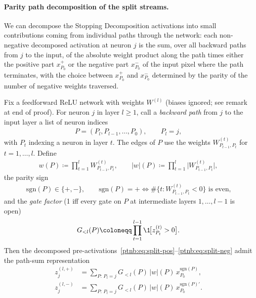 \paragraph{Parity path decomposition of the split streams.}\label{ptnb:app:parity-path}
We can decompose the Stopping Decomposition activations into small contributions coming from
individual paths through the network: each non-negative decomposed activation at neuron $j$ is the
sum, over all backward paths from $j$ to the input, of the absolute weight product along the path
times either the positive part $x_{P_0}^+$ or the negative part $x_{P_0}^-$ of the input pixel
where the path terminates, with the choice between $x_{P_0}^+$ and $x_{P_0}^-$ determined by the
parity of the number of negative weights traversed.

\begin{lemmaenv}\label{ptnb:lem:parity-path}
Fix a feedforward ReLU network with weights $W^{(l)}$ (biases ignored; see remark at end of proof).
For neuron $j$ in layer $l \ge 1$, call a \emph{backward path} from $j$ to the input layer a list
of neuron indices
\begin{align}
    P = (P_l, P_{l-1}, \dots, P_0), \qquad P_l = j,
\end{align}
with $P_t$ indexing a neuron in layer $t$. The edges of $P$ use the weights $W^{(t)}_{P_{t-1},
    P_t}$ for $t = 1, \dots, l$. Define
\begin{align}
    w(P) \coloneqq \prod_{t=1}^{l} W^{(t)}_{P_{t-1}, P_t},
    \qquad
    |w|(P) \coloneqq \prod_{t=1}^{l} \bigl| W^{(t)}_{P_{t-1}, P_t} \bigr|,
\end{align}
the parity sign
\begin{align}
    \mathrm{sgn}(P) \in \{+,-\},
    \qquad
    \mathrm{sgn}(P) = + \iff \#\bigl\{t : W^{(t)}_{P_{t-1}, P_t} < 0\bigr\} \text{ is even,}
\end{align}
and the \emph{gate factor} (1 iff every gate on $P$ at intermediate layers $1,\dots,l-1$ is open)
\begin{align}
    G_{<l}(P) \coloneqq \prod_{t=1}^{l-1} \1\!\bigl[z_{P_t}^{(t)} > 0\bigr].
\end{align}
Then the decomposed pre-activations~\eqref{ptnb:eq:split-pos}--\eqref{ptnb:eq:split-neg} admit the path-sum
representation
\begin{align}
    z_j^{(l,+)} &= \sum_{P:\, P_l = j} G_{<l}(P)\, |w|(P)\, x_{P_0}^{\mathrm{sgn}(P)},
    \label{ptnb:eq:parity-plus}\\
    z_j^{(l,-)} &= \sum_{P:\, P_l = j} G_{<l}(P)\, |w|(P)\, x_{P_0}^{\mathrm{sgn}(P)'}.
    \label{ptnb:eq:parity-minus}
\end{align}
\hfill{}
\end{lemmaenv}

